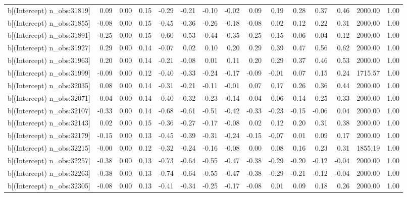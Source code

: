 \begin{table}[ht]
\begin{tabular}{rrrrrrrrrrrrrrr}
  b[(Intercept) n\_obs:31819] & 0.09 & 0.00 & 0.15 & -0.29 & -0.21 & -0.10 & -0.02 & 0.09 & 0.19 & 0.28 & 0.37 & 0.46 & 2000.00 & 1.00 \\ 
  b[(Intercept) n\_obs:31855] & -0.08 & 0.00 & 0.15 & -0.45 & -0.36 & -0.26 & -0.18 & -0.08 & 0.02 & 0.12 & 0.22 & 0.31 & 2000.00 & 1.00 \\ 
  b[(Intercept) n\_obs:31891] & -0.25 & 0.00 & 0.15 & -0.60 & -0.53 & -0.44 & -0.35 & -0.25 & -0.15 & -0.06 & 0.04 & 0.12 & 2000.00 & 1.00 \\ 
  b[(Intercept) n\_obs:31927] & 0.29 & 0.00 & 0.14 & -0.07 & 0.02 & 0.10 & 0.20 & 0.29 & 0.39 & 0.47 & 0.56 & 0.62 & 2000.00 & 1.00 \\ 
  b[(Intercept) n\_obs:31963] & 0.20 & 0.00 & 0.14 & -0.21 & -0.08 & 0.01 & 0.11 & 0.20 & 0.29 & 0.37 & 0.46 & 0.53 & 2000.00 & 1.00 \\ 
  b[(Intercept) n\_obs:31999] & -0.09 & 0.00 & 0.12 & -0.40 & -0.33 & -0.24 & -0.17 & -0.09 & -0.01 & 0.07 & 0.15 & 0.24 & 1715.57 & 1.00 \\ 
  b[(Intercept) n\_obs:32035] & 0.08 & 0.00 & 0.14 & -0.31 & -0.21 & -0.11 & -0.01 & 0.07 & 0.17 & 0.26 & 0.36 & 0.44 & 2000.00 & 1.00 \\ 
  b[(Intercept) n\_obs:32071] & -0.04 & 0.00 & 0.14 & -0.40 & -0.32 & -0.23 & -0.14 & -0.04 & 0.06 & 0.14 & 0.25 & 0.33 & 2000.00 & 1.00 \\ 
  b[(Intercept) n\_obs:32107] & -0.33 & 0.00 & 0.14 & -0.68 & -0.61 & -0.51 & -0.42 & -0.33 & -0.23 & -0.15 & -0.06 & 0.04 & 2000.00 & 1.00 \\ 
  b[(Intercept) n\_obs:32143] & 0.02 & 0.00 & 0.15 & -0.36 & -0.27 & -0.17 & -0.08 & 0.02 & 0.12 & 0.20 & 0.31 & 0.38 & 2000.00 & 1.00 \\ 
  b[(Intercept) n\_obs:32179] & -0.15 & 0.00 & 0.13 & -0.45 & -0.39 & -0.31 & -0.24 & -0.15 & -0.07 & 0.01 & 0.09 & 0.17 & 2000.00 & 1.00 \\ 
  b[(Intercept) n\_obs:32215] & -0.00 & 0.00 & 0.12 & -0.32 & -0.24 & -0.16 & -0.08 & 0.00 & 0.08 & 0.16 & 0.23 & 0.31 & 1855.19 & 1.00 \\ 
  b[(Intercept) n\_obs:32257] & -0.38 & 0.00 & 0.13 & -0.73 & -0.64 & -0.55 & -0.47 & -0.38 & -0.29 & -0.20 & -0.12 & -0.04 & 2000.00 & 1.00 \\ 
  b[(Intercept) n\_obs:32263] & -0.38 & 0.00 & 0.13 & -0.74 & -0.64 & -0.55 & -0.47 & -0.38 & -0.29 & -0.21 & -0.12 & -0.04 & 2000.00 & 1.00 \\ 
  b[(Intercept) n\_obs:32305] & -0.08 & 0.00 & 0.13 & -0.41 & -0.34 & -0.25 & -0.17 & -0.08 & 0.01 & 0.09 & 0.18 & 0.26 & 2000.00 & 1.00 \\ 

\end{tabular}
\end{table}
